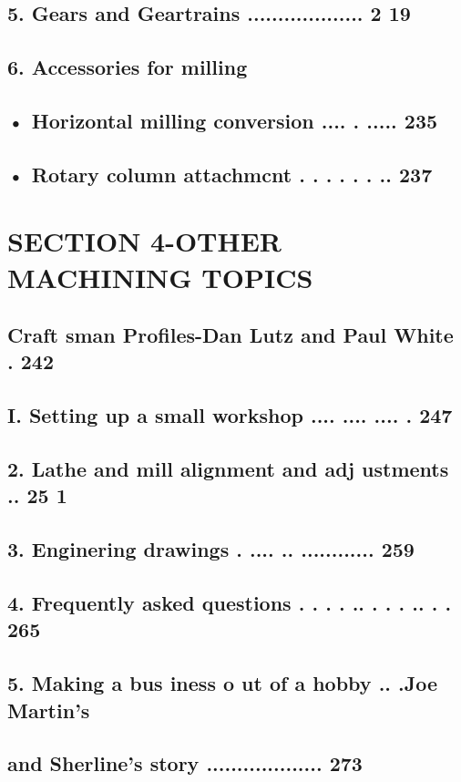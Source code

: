 \section{5. Gears and Geartrains ................... 2 19}
\section{6. Accessories for milling}
\section{• Horizontal milling conversion .... . ..... 235}
\section{• Rotary column attachmcnt . . . . . . .. 237}

\chapter{SECTION 4-OTHER MACHINING TOPICS}
\section{Craft sman Profiles-Dan Lutz and Paul White . 242}
\section{I. Setting up a small workshop .... .... .... . 247}
\section{2. Lathe and mill alignment and adj ustments .. 25 1}
\section{3. Enginering drawings . .... .. ............ 259}
\section{4. Frequently asked questions . . . . .. . . . .. . . 265}
\section{5. Making a bus iness o ut of a hobby .. .Joe Martin's}
\section{and Sherline's story ................... 273}
